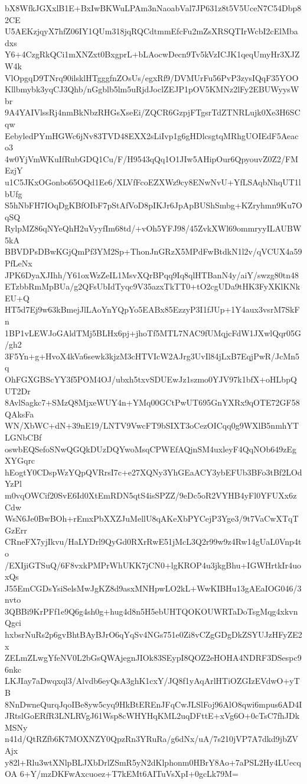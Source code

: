 bX8WfkJGXxlB1E+BxIwBKWuLPAm3nNaoabVal7JP631z8t5V5UceN7C54Dbp82CE
U5AEKzjqyX7hfZ06IY1QUm318jqRQCdtmmEfcFu2mZsXRSQTIrWcbI2cElMbadxs
Y6+4CzgRkQCi1mXNZxt0BxgprL+bLAocwDecn9Tv5kVzICJK1qeqUmyHr3XJZW4k
VlOpgqD9TNrq90ilsklHTgggfnZOsUs/egxRf9/DVMUrFu56PvP3zysIQqF35YOO
Kllbmybk3yqCJ3Qhb/nGgblb5lm5uRjdJoclZEJP1pOV5KMNz2lFy2EBUWyysWbr
9A4YAIVlssRj4nmBkNbzRHGsXseEi/ZQCR6GzpjFTgsrTdZTNRLujk0Xe3H6SCqw
EebyledPYmHGWc6jNv83TVD48EXX2sLiIvp1g6gHDlcsgtqMRhgUOIEdF5Aeaco3
4w0YjVmWKuIfRubGDQ1Cu/F/H9543qQq1O1JIw5AHipOur6QpyouvZ0Z2/FMEzjY
u1C5JKxOGonbo65OQd1Ee6/XLVfFcoEZXWz9cy8ENwNvU+YfLSAqbNhqUT1lbUfg
S5hNbFH7IOqDgKBfOIbF7pStAfVoD8pIKJr6JpApBUShSmbg+KZryhmn9Ku7OqSQ
RylpMZ86qNYeQhH2uVyyfIm68td/+vOh5YFJ98/45ZvkXWl69ommryyILAUBW5kA
BBVDPsDBwKGjQmPf3YM2Sp+ThonJnGRzX5MPdFwBtdkN1l2v/qVCUX4a59PfLeNx
JPK6DyaXJIhh/Y61oxWzZeIL1MsvXQrBPqq9Iq8qlHTBanN4y/aiY/swzg80tn48
ETzbbRmMpBUa/g2QFsUbIdTyqc9V35azxTkTT0+tO2cgUDa9tHK3FyXKlKNkEU+Q
HT5d7Ej9w63kBmejJlLAoYnYQpYo5EABx85EzzyP3I1fJUp+1Y4aux3vsrM7SkFn
1BP1vLEWJoGAldTMj5BLHx6pj+jhoTf5MTL7NAC9fUMqjcFdW1JXwlQqr05G/gh2
3F5Yn+g+HvoX4kVa6sewk3kjzM3cHTVIcW2AJrg3UvIl84jLxB7EqjPwR/JcMn5q
OhFGXGBScYY3f5POM4OJ/ubxh5txvSDUEwJz1szmo0YJV97k1bfX+oHLbpQUT2Dr
8AvlSagkc7+SMzQ8MjxeWUY4n+YMq00GCtPwUT695GnYXRx9qOTE72GF58QAksFa
WN/XbWC+dN+39nE19/LNTV9VwcFT9bSIXT3oCezOICqq0g9WXlB5nmhYTLGNbCBf
oswbEQSefoSNwQGQkDUzDQYwoMsqCPWEfAQjnSM4uxleyF4QqNOb649zEgXYGqrc
hEogtY0CDspWzYQpQVRrsI7c+e27XQNy3YhGEaACY3ybEFUb3BFo3tBf2LOdYzPl
m0vqOWCif20SvE6Id0XtEmRDN5qtS4isSPZZ/9eDc5oR2VYHB4yFl0YFUXx6zCdw
WsN6Je0BwBOh+rEmxPbXXZJuMellU8qAKeXbPYCejP3Yge3/9t7VaCwXTqTGzErr
CRneFX7yjIkvu/HaLYDrl9QyGd0RXrRwE51jMcL3Q2r99w9z4Rw14gUaL0Vnp4to
/EXIjiGTSuQ/6F8vxkPMPrWhUKK7jCN0+lgKROP4u3jkgBhu+IGWHrtkIr4uoxQs
J55EmCGDsYsiSelsMwJgKZ8d9asxMNHpwLO2kL+WwKIBHu13gAEaIOG046/3nvto
3QBBi9KrPFf1e9Q6g4sh0g+hug4d8n5H5ebUHTQOKOUWRTaDoTsgMqg4xkvnQgci
hxbsrNuRs2p6gvBhtBAyBJrO6qYqSv4NGs751e0Zi8vCZgGDgDkZSYUJzHFyZE2x
ZELmZLwgYfeNV0L2bGsQWAjegnJIOk83SEypI8QOZ2eHOHA4NDRF3DSespc96nkc
LKJIay7aDwqxql3/Alvdb6eyQsA3ghK1cxY/JQ8f1yAqArlHTiOZGIzEVdwO+yTB
8NnDwneQurqJqoIBe8yw5cyq9HkBtEREnJFqCwJLSlFoj96AlO8qwi6mpus6AD4I
JRtslGoERfR3LNLRVgJ61Wsp8cWHYHqKML2uqDFttE+xVg6O+0cTsC7fhJDkMSNy
n41d/QtRZfb6K7MOXNZY0QpzRn3YRuRa/g6dNx/uA/7s210jVP7A7dkd9jbZVAjx
y82l+Rlu3wtXNlpBLJXbDrlZSmR5yN2dKlphonm0HBrY8Ao+7aPSL2Hy4LUecqOA
6+Y/mzDKFwAxcuoez+T7kEMt6AITuVsXpI+0gcLk79M=
